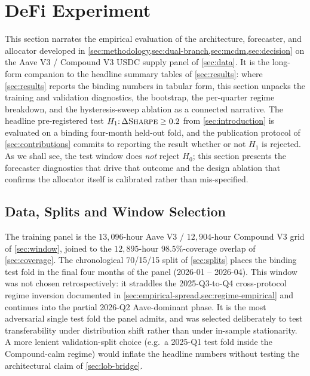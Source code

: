 
\section{DeFi Experiment}
\label{sec:defi-experiment}

This section narrates the empirical evaluation of the architecture,
forecaster, and allocator developed in
\cref{sec:methodology,sec:dual-branch,sec:mcdm,sec:decision} on the
Aave V3 / Compound V3 USDC supply panel of \cref{sec:data}. It is the
long-form companion to the headline summary tables of
\cref{sec:results}: where \cref{sec:results} reports the binding
numbers in tabular form, this section unpacks the training and
validation diagnostics, the bootstrap, the per-quarter regime
breakdown, and the hysteresis-sweep ablation as a connected narrative.
The headline pre-registered test
$H_1{:}\,\Delta\textsc{Sharpe}\ge 0.2$ from \cref{sec:introduction}
is evaluated on a binding four-month held-out fold, and the
publication protocol of \cref{sec:contributions} commits to reporting
the result whether or not $H_1$ is rejected. As we shall see, the
test window does \emph{not} reject $H_0$; this section presents the
forecaster diagnostics that drive that outcome and the design
ablation that confirms the allocator itself is calibrated rather than
mis-specified.

\subsection{Data, Splits and Window Selection}
\label{sec:defi-data-narrative}

The training panel is the $13{,}096$-hour Aave V3 / $12{,}904$-hour
Compound V3 grid of \cref{sec:window}, joined to the
$12{,}895$-hour $98.5\%$-coverage overlap of \cref{sec:coverage}.
The chronological 70/15/15 split of \cref{sec:splits} places the
binding test fold in the final four months of the panel
(2026-01 -- 2026-04). This window was not chosen retrospectively: it
straddles the 2025-Q3-to-Q4 cross-protocol regime inversion documented
in \cref{sec:empirical-spread,sec:regime-empirical} and continues
into the partial 2026-Q2 Aave-dominant phase. It is the most
adversarial single test fold the panel admits, and was selected
deliberately to test transferability under distribution shift rather
than under in-sample stationarity. A more lenient validation-split
choice (e.g.\ a 2025-Q1 test fold inside the Compound-calm regime)
would inflate the headline numbers without testing the architectural
claim of \cref{sec:lob-bridge}.


